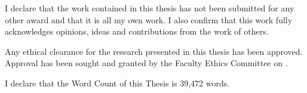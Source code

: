 \begin{declaration}
I declare that the work contained in this thesis has not been submitted for any other award
and that it is all my own work. I also confirm that this work fully acknowledges opinions,
ideas and contributions from the work of others.

Any ethical clearance for the research presented in this thesis has been approved. Approval
has been sought and granted by the Faculty Ethics Committee on 
\EthicalCommitteeDate.


I declare that the Word Count of this Thesis is 39,472 words.

\end{declaration}
